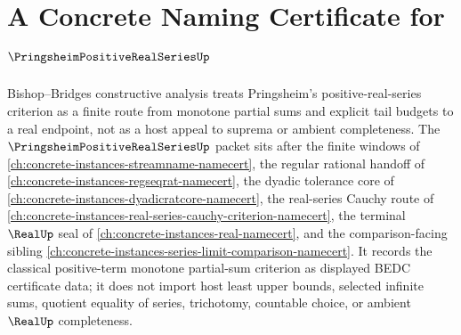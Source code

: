 \chapter{A Concrete Naming Certificate for $\PringsheimPositiveRealSeriesUp$}
\label{ch:concrete-instances-pringsheim-positive-real-series-namecert}

Bishop--Bridges constructive analysis treats Pringsheim's positive-real-series criterion as a finite route from monotone partial sums and explicit tail budgets to a real endpoint, not as a host appeal to suprema or ambient completeness. The $\PringsheimPositiveRealSeriesUp$ packet sits after the finite windows of \autoref{ch:concrete-instances-streamname-namecert}, the regular rational handoff of \autoref{ch:concrete-instances-regseqrat-namecert}, the dyadic tolerance core of \autoref{ch:concrete-instances-dyadicratcore-namecert}, the real-series Cauchy route of \autoref{ch:concrete-instances-real-series-cauchy-criterion-namecert}, the terminal $\RealUp$ seal of \autoref{ch:concrete-instances-real-namecert}, and the comparison-facing sibling \autoref{ch:concrete-instances-series-limit-comparison-namecert}. It records the classical positive-term monotone partial-sum criterion as displayed BEDC certificate data; it does not import host least upper bounds, selected infinite sums, quotient equality of series, trichotomy, countable choice, or ambient $\RealUp$ completeness.

